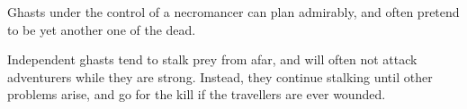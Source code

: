 \begin{multicols}{2}
\begin{itemize}
\end{itemize}

Ghasts under the control of a necromancer can plan admirably, and often pretend to be yet another one of the dead.

Independent ghasts tend to stalk prey from afar, and will often not attack adventurers while they are strong.
Instead, they continue stalking until other problems arise, and go for the kill if the travellers are ever wounded.

\end{multicols}
